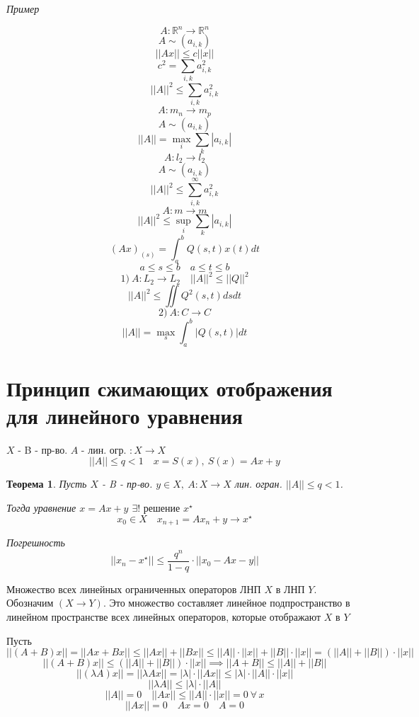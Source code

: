 \documentclass[a4paper]{article}
\newtheorem*{theorem}{Теорема}
\theoremstyle{definition}
\theoremstyle{remark}
\begin{document}
\emph{Пример}

\[
    A: \mathbb{R}^{n} \to \mathbb{R}^{n}
\]
\[
    A \sim (a_{i,k})
\]
\[
    ||Ax|| \leq c||x||
\]
\[
    c^2 = \sum_{i,k} a^2_{i,k}
\]
\[
    ||A||^2 \leq \sum_{i,k} a^2_{i,k}
\]
\[
    A :m_n \to m_p
\]
\[
    A \sim (a_{i,k})
\]
\[
    ||A|| = \max_i \sum_{k} |a_{i,k}|
\]
\[
    A : l_2 \to l_2
\]
\[
    A \sim (a_{i,k})
\]
\[
    ||A||^2 \leq \sum_{i,k}^{\infty} a^2_{i,k}
\]
\[
    A :m \to m
\]
\[
    ||A||^2 \leq \sup_i \sum_{k} |a_{i,k}|
\]
\[
    (Ax)_{(s)} = \int_{a}^{b} Q(s,t) x(t) dt
\]
\[
    a \leq s \leq b \quad a \leq t \leq b
\]
\[
    1) \ A: L_2 \to L_2 \quad ||A||^2 \leq ||Q||^2
\]
\[
    ||A||^2 \leq \iint Q^2(s,t) dsdt
\]
\[
    2) \ A: C \to C
\]
\[
    ||A|| = \max_s \int_{a}^{b} |Q(s,t)|dt
\]

\section*{\centering Принцип сжимающих отображения для линейного уравнения}
$ X $ - B - пр-во. $ A $ - лин. огр. $ : X \to X $ 
\[
    ||A|| \leq q < 1 \quad x = S(x), \ S(x) = Ax + y
\]

\begin{tcolorbox}
\begin{theorem}
    Пусть $ X $ - B - пр-во. $ y \in X, \ A: X \to X $ лин. огран. 
    $ ||A|| \leq q < 1 $.

    Тогда уравнение $ x = Ax + y $ $\exists ! \text{ решение } x^{\star}$
    \[
        x_0 \in X \quad x_{n+1} = Ax_{n} + y \to x^{\star}
    \]

    Погрешность
    \[
        ||x_n - x^{\star}|| \leq \frac{q^n}{1-q} \cdot ||x_0 - Ax - y||
    \]
\end{theorem}
\end{tcolorbox}

Множество всех линейных ограниченных операторов ЛНП $ X $ в ЛНП $ Y $.
Обозначим $ (X \to Y) $. Это множество составляет линейное подпространство
в линейном пространстве всех линейных операторов, которые отображают $ X $ в $ Y $ 

Пусть $ ||(A+B)x|| = ||Ax + Bx|| \leq ||Ax|| + ||Bx|| \leq ||A||\cdot ||x||
+ ||B|| \cdot ||x|| = (||A|| + ||B||) \cdot ||x||$ 
\[
    ||(A+B)x|| \leq (||A|| + ||B||) \cdot ||x|| \implies ||A+B|| \leq 
    ||A|| + ||B||
\]
\[
    ||(\lambda A)x|| = ||\lambda Ax|| = |\lambda|\cdot ||Ax|| \leq 
    |\lambda| \cdot ||A||\cdot ||x||
\]
\[
    ||\lambda A|| \leq |\lambda| \cdot ||A||
\]
\[
    ||A|| = 0 \quad ||Ax|| \leq ||A|| \cdot ||x|| = 0 \ \forall \, x
\]
\[
    ||Ax|| = 0 \quad Ax = 0 \quad A = 0
\]
\end{document}
